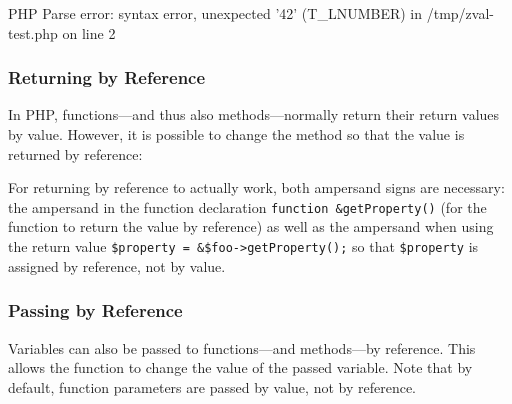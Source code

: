 \begin{textcode}
PHP Parse error:  syntax error, unexpected '42' (T_LNUMBER) in
  /tmp/zval-test.php on line 2
\end{textcode}


\subsubsection{Returning by Reference}

In PHP, functions---and thus also methods---normally return their return values by value. However, it is possible to change the method so that the value is returned by reference:~\cite{php-manual-returning-reference}



For returning by reference to actually work, both ampersand signs are necessary: the ampersand in the function declaration \texttt{function \&getProperty()} (for the function to return the value by reference) as well as the ampersand when using the return value \texttt{\$property = \&\$foo->getProperty();} so that \texttt{\$property} is assigned by reference, not by value.


\subsubsection{Passing by Reference}

Variables can also be passed to functions---and methods---by reference. \cite{php-manual-passing-by-reference} This allows the function to change the value of the passed variable. Note that by default, function parameters are passed by value, not by reference.


